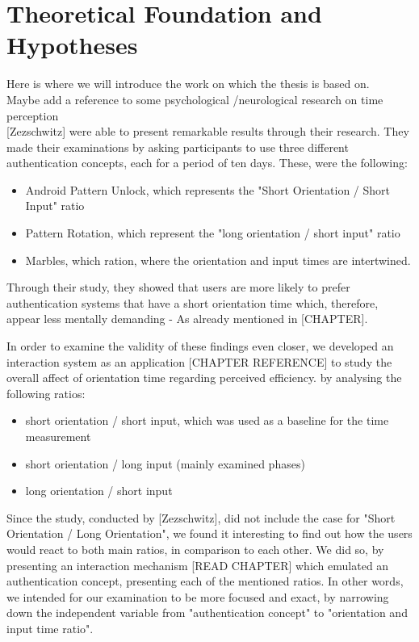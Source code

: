 
\chapter{Theoretical Foundation and Hypotheses}\label{ch:third}

Here is where we will introduce the work on which the thesis is based on. \\
Maybe add a reference to some psychological /neurological research on time perception \\

[Zezschwitz] were able to present remarkable results through their research. They made their examinations by asking participants to use three different authentication concepts, each for a period of ten days. These, were the following: 

\begin{itemize}
    \item Android Pattern Unlock, which represents the "Short Orientation / Short Input" ratio
    \item Pattern Rotation, which represent the "long orientation / short input" ratio
    \item Marbles, which ration, where the orientation and input times are intertwined.
\end{itemize}

Through their study, they showed that users are more likely to prefer authentication systems that have a short orientation time which, therefore, appear less mentally demanding - As already mentioned in [CHAPTER].\par
In order to examine the validity of these findings even closer, we developed an interaction system as an application [CHAPTER REFERENCE] to study the overall affect of orientation time regarding perceived efficiency.  by analysing the following ratios: 

\begin{itemize}
    \item short orientation / short input, which was used as a baseline for the time measurement
    \item short orientation / long input (mainly examined phases)
    \item long orientation / short input
\end{itemize}

Since the study, conducted by [Zezschwitz], did not include the case for "Short Orientation / Long Orientation", we found it interesting to find out how the users would react to both main ratios, in comparison to each other. We did so, by presenting an interaction mechanism [READ CHAPTER] which emulated an authentication concept, presenting each of the mentioned ratios. In other words, we intended for our examination to be more focused and exact, by narrowing down the independent variable from "authentication concept" to "orientation and input time ratio".